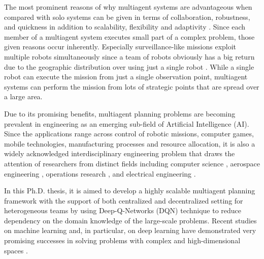 \documentclass{ituphdreport}
\begin{document}
The most prominent reasons of why multiagent systems are advantageous when compared with solo systems can be given in terms of collaboration, robustness, and quickness in addition to scalability, flexibility and adaptivity \cite{clement04}. Since each member of a multiagent system executes small part of a complex problem, those given reasons occur inherently. Especially surveillance-like missions exploit multiple robots simultaneously since a team of robots obviously has a big return due to the geographic distribution over using just a single robot \cite{stone00}. While a single robot can execute the mission from just a single observation point, multiagent systems can perform the mission from lots of strategic points that are spread over a large area.

Due to its promising benefits, multiagent planning problems are becoming prevalent in engineering as an emerging sub-field of Artificial Intelligence (AI). Since the applications range across control of robotic missions, computer games, mobile technologies, manufacturing processes and resource allocation, it is also a widely acknowledged interdisciplinary engineering problem that draws the attention of researchers from distinct fields including computer science \cite{stone00}, aerospace engineering \cite{tomlin98}, operations research \cite{swaminathan98}, and electrical engineering \cite{glavic06}.

In this Ph.D. thesis, it is aimed to develop a highly scalable multiagent planning framework with the support of both centralized and decentralized setting for heterogeneous teams by using Deep-Q-Networks (DQN) technique to reduce dependency on the domain knowledge of the large-scale problems. Recent studies on machine learning and, in particular, on deep learning have demonstrated very promising successes in solving problems with complex and high-dimensional spaces \cite{silver2016mastering} \cite{zhang2016learning}\cite{mnih-dqn-2015}.
\end{document}
